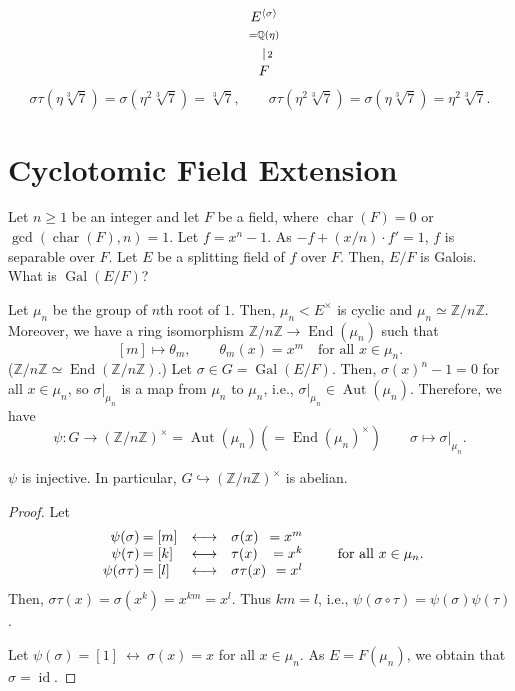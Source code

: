 \documentclass[twoside]{article}
\DeclareMathOperator\Aut{Aut}
\DeclareMathOperator\Char{char}
\DeclareMathOperator\End{End}
\DeclareMathOperator\Gal{Gal}
\DeclareMathOperator\id{id}
\newcommand\Z{\mathbb Z}
\newcommand\Q{\mathbb Q}
\theoremstyle{remark}
\newcounter{theorem}
\begin{document}
\begin{examples}
\begin{enumerate}[label=\arabic*.]
\begin{displaymath}
\begin{tikzcd}[column sep = tiny, row sep = small]
        & \begin{array}{@{}c@{}} E^{\langle\sigma\rangle} \\ \scriptstyle = \Q(\eta) \dar[dash,"2"] \end{array} \\
        & F
      \end{tikzcd}
    \end{displaymath}
    \[ \sigma\tau(\eta\sqrt[3]7) = \sigma(\eta^2\sqrt[3]7) = \sqrt[3]7, \qquad \sigma\tau(\eta^2\sqrt[3]7) = \sigma(\eta\sqrt[3]7) = \eta^2\sqrt[3]7. \]
  \end{enumerate}
\end{examples}

\section{Cyclotomic Field Extension}

Let \(n \geq 1\) be an integer and let \(F\) be a field, where \(\Char(F) = 0\) or \(\gcd(\Char(F),n) = 1\). Let \(f = x^n-1\). As \(-f + (x/n) \cdot f' = 1\), \(f\) is separable over \(F\). Let \(E\) be a splitting field of \(f\) over \(F\). Then, \(E/F\) is Galois. What is \(\Gal(E/F)\)?

Let \(\mu_n\) be the group of \(n\)th root of \(1\). Then, \(\mu_n < E^\times\) is cyclic and \(\mu_n \simeq \Z/n\Z\). Moreover, we have a ring isomorphism \(\Z/n\Z \to \End(\mu_n)\) such that
\[ [m] \mapsto \theta_m, \qquad \theta_m(x) = x^m \quad \text{for all } x \in \mu_n. \]
(\(\Z/n\Z \simeq \End(\Z/n\Z)\).) Let \(\sigma \in G = \Gal(E/F)\). Then, \(\sigma(x)^n - 1 = 0\) for all \(x \in \mu_n\), so \(\sigma|_{\mu_n}\) is a map from \(\mu_n\) to \(\mu_n\), i.e., \(\sigma|_{\mu_n} \in \Aut(\mu_n)\). Therefore, we have
\[ \psi\colon G \longrightarrow (\Z/n\Z)^\times = \Aut(\mu_n) (= \End(\mu_n)^\times) \qquad \sigma \longmapsto \sigma|_{\mu_n}. \]

\begin{theorem}
  \(\psi\) is injective. In particular, \(G \hookrightarrow (\Z/n\Z)^\times\) is abelian.
\end{theorem}

\begin{proof}
  Let
  \begin{displaymath}
    \begin{array}{r@{\>}l@{\quad \longleftrightarrow \quad} l@{\>}r}
      \psi(\sigma) & = [m] & \sigma(x) & = x^m \\
      \psi(\tau) & = [k] & \tau(x) & = x^k \\
      \psi(\sigma\tau) & = [l] & \sigma\tau(x) & = x^l
    \end{array}
    \qquad \text{for all \(x \in \mu_n\).}
  \end{displaymath}
  Then, \(\sigma\tau(x) = \sigma(x^k) = x^{km} = x^l\). Thus \(km = l\), i.e., \(\psi(\sigma\circ\tau) = \psi(\sigma)\psi(\tau)\).
  
  Let \(\psi(\sigma) = [1]~\leftrightarrow~\sigma(x) = x\) for all \(x \in \mu_n\). As \(E = F(\mu_n)\), we obtain that \(\sigma = \id\).
\end{proof}
\end{document}
